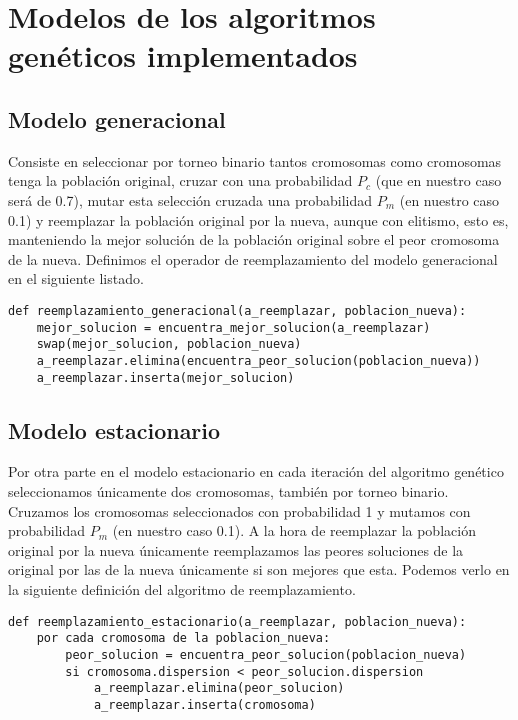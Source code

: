 \section{Modelos de los algoritmos genéticos implementados}

\subsection{Modelo generacional}

Consiste en seleccionar por torneo binario tantos cromosomas como cromosomas tenga la población original, cruzar
con una probabilidad $P_{c}$ (que en nuestro caso será de 0.7), mutar esta selección cruzada
una probabilidad $P_{m}$ (en nuestro caso 0.1) y reemplazar la población original por la nueva, aunque con elitismo,
esto es, manteniendo la mejor solución de la población original sobre el peor cromosoma de la nueva.
Definimos el operador de reemplazamiento del modelo generacional en el siguiente listado.

\begin{minipage}{\textwidth}
\begin{lstlisting}[mathescape=true,caption={Definición del operador de reemplazamiento del modelo generacional.},captionpos=b]
def reemplazamiento_generacional(a_reemplazar, poblacion_nueva):
	mejor_solucion = encuentra_mejor_solucion(a_reemplazar)
	swap(mejor_solucion, poblacion_nueva)
	a_reemplazar.elimina(encuentra_peor_solucion(poblacion_nueva))
	a_reemplazar.inserta(mejor_solucion)
\end{lstlisting}
\end{minipage}

\subsection{Modelo estacionario}

Por otra parte en el modelo estacionario en cada iteración del algoritmo genético seleccionamos únicamente dos
cromosomas, también por torneo binario. Cruzamos los cromosomas seleccionados con probabilidad 1 y mutamos con
probabilidad $P_{m}$ (en nuestro caso 0.1). A la hora de reemplazar la población original por la nueva únicamente
reemplazamos las peores soluciones de la original por las de la nueva únicamente si son mejores que esta. Podemos
verlo en la siguiente definición del algoritmo de reemplazamiento.

\begin{minipage}{\textwidth}
\begin{lstlisting}[mathescape=true,caption={Definición del operador de reemplazamiento del modelo estacionario.},captionpos=b]
def reemplazamiento_estacionario(a_reemplazar, poblacion_nueva):
	por cada cromosoma de la poblacion_nueva:
		peor_solucion = encuentra_peor_solucion(poblacion_nueva)
		si cromosoma.dispersion < peor_solucion.dispersion
			a_reemplazar.elimina(peor_solucion)
			a_reemplazar.inserta(cromosoma)
\end{lstlisting}
\end{minipage}